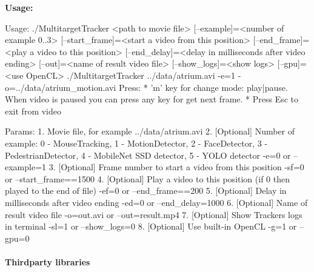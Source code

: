 {\bfseries Usage\+:} \begin{DoxyVerb}       Usage:
         ./MultitargetTracker <path to movie file> [--example]=<number of example 0..3> [--start_frame]=<start a video from this position> [--end_frame]=<play a video to this position> [--end_delay]=<delay in milliseconds after video ending> [--out]=<name of result video file> [--show_logs]=<show logs> [--gpu]=<use OpenCL>
         ./MultitargetTracker ../data/atrium.avi -e=1 -o=../data/atrium_motion.avi
       Press:
       * 'm' key for change mode: play|pause. When video is paused you can press any key for get next frame.
       * Press Esc to exit from video

       Params: 
       1. Movie file, for example ../data/atrium.avi
       2. [Optional] Number of example: 0 - MouseTracking, 1 - MotionDetector, 2 - FaceDetector, 3 - PedestrianDetector, 4 - MobileNet SSD detector, 5 - YOLO detector
          -e=0 or --example=1
       3. [Optional] Frame number to start a video from this position
          -sf=0 or --start_frame==1500
       4. [Optional] Play a video to this position (if 0 then played to the end of file)
          -ef=0 or --end_frame==200
       5. [Optional] Delay in milliseconds after video ending
          -ed=0 or --end_delay=1000
       6. [Optional] Name of result video file
          -o=out.avi or --out=result.mp4
       7. [Optional] Show Trackers logs in terminal
          -sl=1 or --show_logs=0
       8. [Optional] Use built-in OpenCL
          -g=1 or --gpu=0
\end{DoxyVerb}


\paragraph*{Thirdparty libraries}


